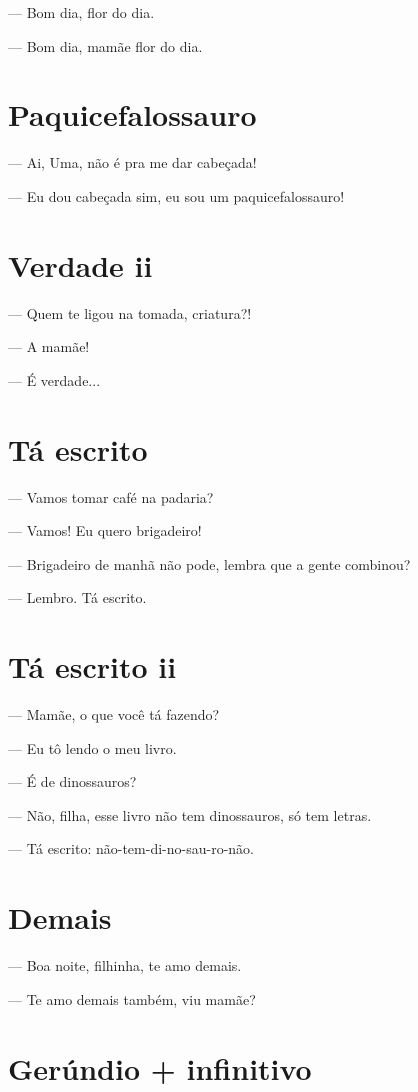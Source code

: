 — Bom dia, flor do dia.

— Bom dia, mamãe flor do dia.

\chapter{Paquicefalossauro}

— Ai, Uma, não é pra me dar cabeçada!

— Eu dou cabeçada sim, eu sou um paquicefalossauro!

\chapter{Verdade ii}

— Quem te ligou na tomada, criatura?!

— A mamãe!

— É verdade...

\chapter{Tá escrito}

— Vamos tomar café na padaria?

— Vamos! Eu quero brigadeiro!

— Brigadeiro de manhã não pode, lembra que a gente combinou?

— Lembro. Tá escrito.

\chapter{Tá escrito ii}

— Mamãe, o que você tá fazendo?

— Eu tô lendo o meu livro.

— É de dinossauros?

— Não, filha, esse livro não tem dinossauros, só tem letras.

— Tá escrito: não-tem-di-no-sau-ro-não.

\chapter{Demais}

— Boa noite, filhinha, te amo demais.

— Te amo demais também, viu mamãe?

\chapter{Gerúndio + infinitivo}

